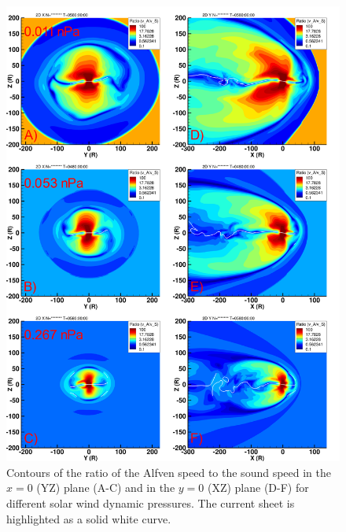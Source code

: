 \begin{figure}
    \centering
    \includegraphics[height=0.9\textheight]{images5/compare_runs_currentsheet_RatioAlfvenSonic.png}
    \caption{Contours of the ratio of the Alfven speed to the sound speed in the $x=0$ (YZ) plane (A-C) and in the $y=0$ (XZ) plane (D-F) for different solar wind dynamic pressures. The current sheet is highlighted as a solid white curve.}
    \label{fig:chp5-comparison-slices-ratioalfvensound}
\end{figure}

